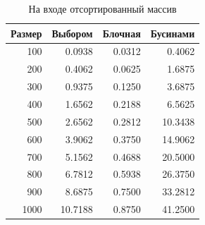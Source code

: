 \begin{table}[h]
	\begin{center}
		\begin{threeparttable}
		\captionsetup{justification=raggedright,singlelinecheck=off}
		\caption{На входе отсортированный массив}
		\label{tbl:best}
		\begin{tabular}{|r|r|r|r|}
			\hline
			Размер & Выбором & Блочная & Бусинами \\
			\hline
  			 100 & 0.0938 & 0.0312 & 0.4062 \\ 
  			\hline
  			200 & 0.4062 & 0.0625 & 1.6875 \\ 
  			\hline
  			300 & 0.9375 & 0.1250 & 3.6875 \\ 
  			\hline
  			400 & 1.6562 & 0.2188 & 6.5625 \\ 
  			\hline
  			500 & 2.6562 & 0.2812 & 10.3438 \\ 
  			\hline
  			600 & 3.9062 & 0.3750 & 14.9062 \\ 
  			\hline
  			700 & 5.1562 & 0.4688 & 20.5000 \\ 
  			\hline
  			800 & 6.7812 & 0.5938 & 26.3750 \\ 
  			\hline
  			900 & 8.6875 & 0.7500 & 33.2812 \\ 
  			\hline
  			1000 & 10.7188 & 0.8750 & 41.2500 \\ 
  			\hline
		\end{tabular}
		\end{threeparttable}
    \end{center}
\end{table}

